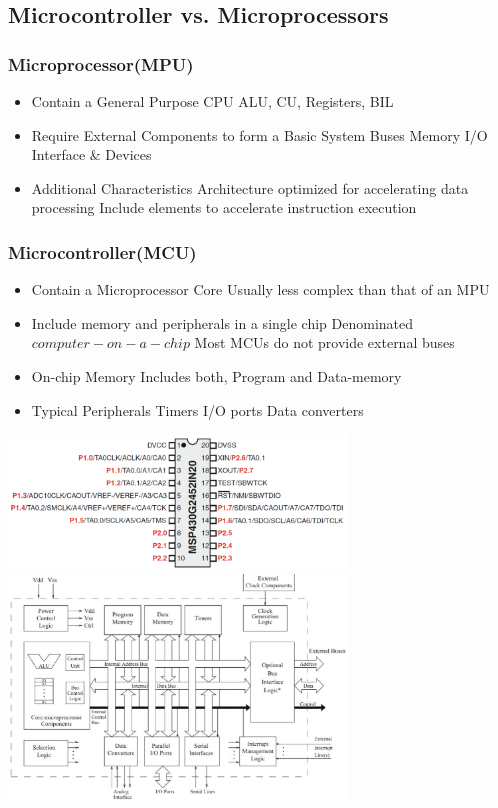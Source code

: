 \subsection{Microcontroller vs. Microprocessors }
\begin{multicols}{2}
		\subsubsection{Microprocessor(MPU) }
		\begin{itemize}
			\item Contain a General Purpose CPU
			\subitem ALU, CU, Registers, BIL %
			\item Require External Components to form a Basic System
			\subitem Buses
			\subitem Memory
			\subitem I/O Interface \& Devices
			\item Additional Characteristics
			\subitem Architecture optimized for accelerating data processing
			\subitem Include elements to accelerate instruction execution  
		\end{itemize}
\subsubsection{Microcontroller(MCU)}
		\begin{itemize}
			\item Contain a Microprocessor Core
			\subitem Usually less complex than that of an MPU
			\item Include memory and peripherals in a single chip
			\subitem Denominated $ computer-on-a-chip $ 
			\subitem Most MCUs do not provide external buses
			\item On-chip Memory
			\subitem Includes both, Program and Data-memory
			\item Typical Peripherals
			\subitem Timers
			\subitem I/O ports
			\subitem Data converters
		\end{itemize}
\end{multicols}

    \includegraphics[width=9cm]{images/msp430hardware}
	\includegraphics[width=9cm]{images/mCStructure}

